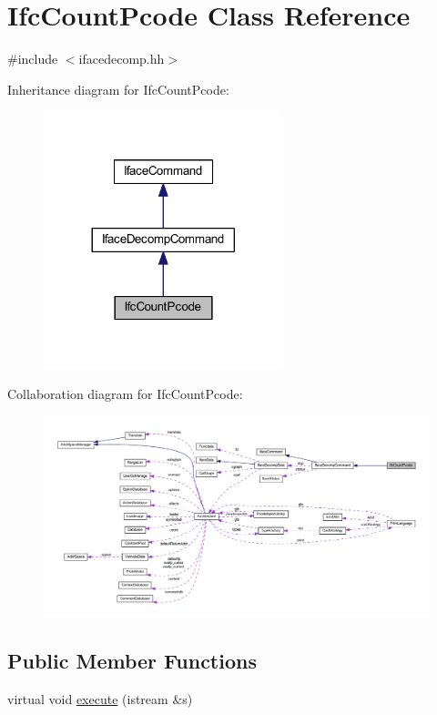 \hypertarget{class_ifc_count_pcode}{}\section{Ifc\+Count\+Pcode Class Reference}
\label{class_ifc_count_pcode}


{\ttfamily \#include $<$ifacedecomp.\+hh$>$}



Inheritance diagram for Ifc\+Count\+Pcode\+:
\nopagebreak
\begin{figure}[H]
\begin{center}
\leavevmode
\includegraphics[width=197pt]{class_ifc_count_pcode__inherit__graph}
\end{center}
\end{figure}


Collaboration diagram for Ifc\+Count\+Pcode\+:
\nopagebreak
\begin{figure}[H]
\begin{center}
\leavevmode
\includegraphics[width=350pt]{class_ifc_count_pcode__coll__graph}
\end{center}
\end{figure}
\subsection*{Public Member Functions}
\begin{DoxyCompactItemize}
\item 
virtual void \mbox{\hyperlink{class_ifc_count_pcode_ae6be267ea3118053a6e9945faa609350}{execute}} (istream \&s)
\end{DoxyCompactItemize}
